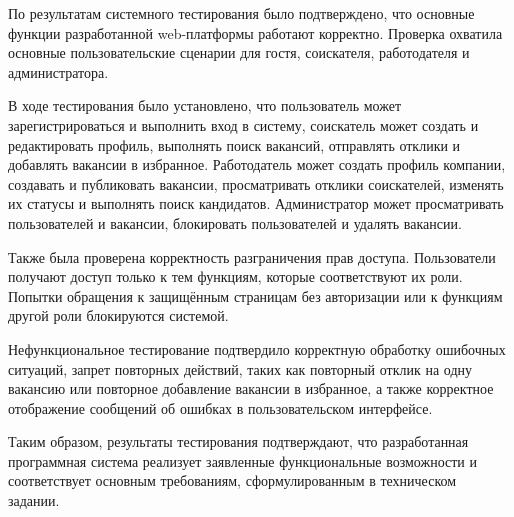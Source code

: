 По результатам системного тестирования было подтверждено, что основные функции разработанной web-платформы работают корректно. Проверка охватила основные пользовательские сценарии для гостя, соискателя, работодателя и администратора.

В ходе тестирования было установлено, что пользователь может зарегистрироваться и выполнить вход в систему, соискатель может создать и редактировать профиль, выполнять поиск вакансий, отправлять отклики и добавлять вакансии в избранное. Работодатель может создать профиль компании, создавать и публиковать вакансии, просматривать отклики соискателей, изменять их статусы и выполнять поиск кандидатов. Администратор может просматривать пользователей и вакансии, блокировать пользователей и удалять вакансии.

Также была проверена корректность разграничения прав доступа. Пользователи получают доступ только к тем функциям, которые соответствуют их роли. Попытки обращения к защищённым страницам без авторизации или к функциям другой роли блокируются системой.

Нефункциональное тестирование подтвердило корректную обработку ошибочных ситуаций, запрет повторных действий, таких как повторный отклик на одну вакансию или повторное добавление вакансии в избранное, а также корректное отображение сообщений об ошибках в пользовательском интерфейсе.

Таким образом, результаты тестирования подтверждают, что разработанная программная система реализует заявленные функциональные возможности и соответствует основным требованиям, сформулированным в техническом задании.
